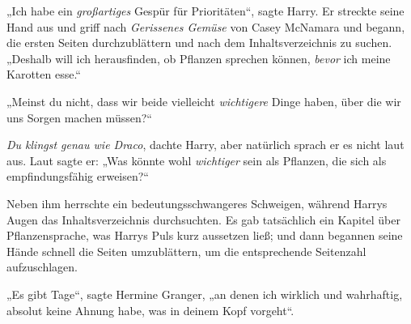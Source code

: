 „Ich habe ein \emph{großartiges} Gespür für Prioritäten“, sagte Harry. Er streckte seine Hand aus und griff nach \emph{Gerissenes Gemüse} von Casey McNamara und begann, die ersten Seiten durchzublättern und nach dem Inhaltsverzeichnis zu suchen. „Deshalb will ich herausfinden, ob Pflanzen sprechen können, \emph{bevor} ich meine Karotten esse.“

„Meinst du nicht, dass wir beide vielleicht \emph{wichtigere} Dinge haben, über die wir uns Sorgen machen müssen?“

\emph{Du klingst genau wie Draco}, dachte Harry, aber natürlich sprach er es nicht laut aus. Laut sagte er: „Was könnte wohl \emph{wichtiger} sein als Pflanzen, die sich als empfindungsfähig erweisen?“

Neben ihm herrschte ein bedeutungsschwangeres Schweigen, während Harrys Augen das Inhaltsverzeichnis durchsuchten. Es gab tatsächlich ein Kapitel über Pflanzensprache, was Harrys Puls kurz aussetzen ließ; und dann begannen seine Hände schnell die Seiten umzublättern, um die entsprechende Seitenzahl aufzuschlagen.

„Es gibt Tage“, sagte Hermine Granger, „an denen ich wirklich und wahrhaftig, absolut keine Ahnung habe, was in deinem Kopf vorgeht“.

